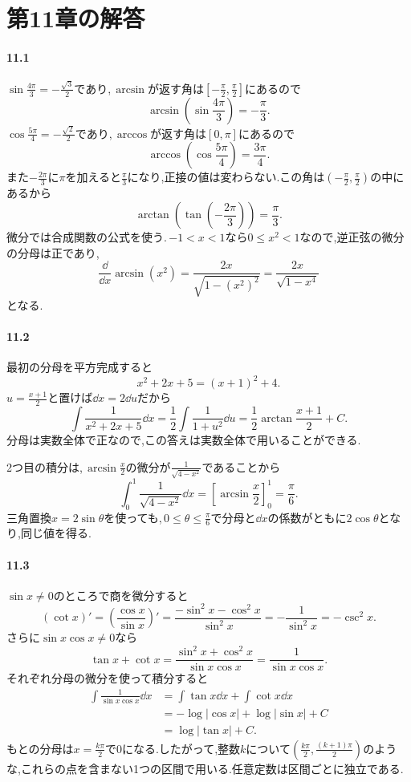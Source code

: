 \section{第11章の解答}\label{解答:第11章}

\paragraph{11.1}
$\sin\frac{4\pi}3=-\frac{\sqrt3}2$であり,\,$\arcsin$が返す角は$\left[-\frac\pi2,\frac\pi2\right]$にあるので
\[
\arcsin\left(\sin\frac{4\pi}3\right)=-\frac\pi3.
\]
$\cos\frac{5\pi}4=-\frac{\sqrt2}2$であり,\,$\arccos$が返す角は$[0,\pi]$にあるので
\[
\arccos\left(\cos\frac{5\pi}4\right)=\frac{3\pi}4.
\]
また$-\frac{2\pi}3$に$\pi$を加えると$\frac\pi3$になり,正接の値は変わらない.この角は$\left(-\frac\pi2,\frac\pi2\right)$の中にあるから
\[
\arctan\left(\tan\left(-\frac{2\pi}3\right)\right)=\frac\pi3.
\]
微分では合成関数の公式を使う.\,$-1<x<1$なら$0\le x^2<1$なので,逆正弦の微分の分母は正であり,
\[
\frac{\dd}{\dd x}\arcsin(x^2)
=\frac{2x}{\sqrt{1-(x^2)^2}}
=\frac{2x}{\sqrt{1-x^4}}
\]
となる.

\paragraph{11.2}
最初の分母を平方完成すると
\[
x^2+2x+5=(x+1)^2+4.
\]
$u=\frac{x+1}{2}$と置けば$\dd x=2\dd u$だから
\[
\int\frac1{x^2+2x+5}\dd x
=\frac12\int\frac1{1+u^2}\dd u
=\frac12\arctan\frac{x+1}{2}+C.
\]
分母は実数全体で正なので,この答えは実数全体で用いることができる.

2つ目の積分は,\,$\arcsin\frac x2$の微分が$\frac1{\sqrt{4-x^2}}$であることから
\[
\int_0^1\frac1{\sqrt{4-x^2}}\dd x
=\left[\arcsin\frac x2\right]_0^1
=\frac\pi6.
\]
三角置換$x=2\sin\theta$を使っても,\,$0\le\theta\le\frac\pi6$で分母と$\dd x$の係数がともに$2\cos\theta$となり,同じ値を得る.

\paragraph{11.3}
$\sin x\ne0$のところで商を微分すると
\[
(\cot x)'
=\left(\frac{\cos x}{\sin x}\right)'
=\frac{-\sin^2x-\cos^2x}{\sin^2x}
=-\frac1{\sin^2x}=-\csc^2x.
\]
さらに$\sin x\cos x\ne0$なら
\[
\tan x+\cot x
=\frac{\sin^2x+\cos^2x}{\sin x\cos x}
=\frac1{\sin x\cos x}.
\]
それぞれ分母の微分を使って積分すると
\[
\begin{aligned}
\int\frac1{\sin x\cos x}\dd x
&=\int\tan x\dd x+\int\cot x\dd x\\
&=-\log|\cos x|+\log|\sin x|+C\\
&=\log|\tan x|+C.
\end{aligned}
\]
もとの分母は$x=\frac{k\pi}{2}$で$0$になる.したがって,整数$k$について$\left(\frac{k\pi}{2},\frac{(k+1)\pi}{2}\right)$のような,これらの点を含まない1つの区間で用いる.任意定数は区間ごとに独立である.

